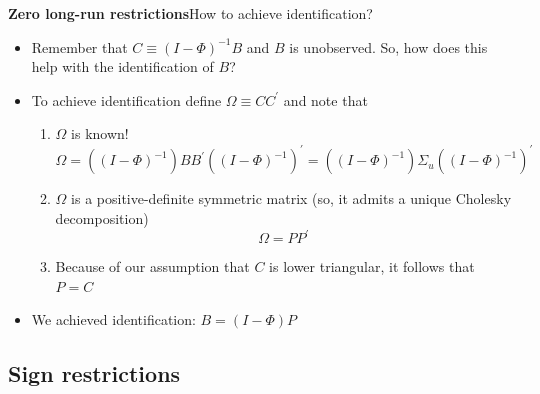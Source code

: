 \begin{frame}
{\textbf{Zero long-run restrictions}}{How to achieve identification?}%
\smallskip

\begin{itemize}
\item Remember that $C\equiv \left( I-\Phi \right) ^{-1}B$ and $B$ is
unobserved. So, how does this help with the identification of $B$?\bigskip 
\pause

\item To achieve identification define $\Omega \equiv CC^{\prime }$ and note
that\smallskip

\begin{enumerate}
\item $\Omega $ is known!%
\begin{equation*}
\Omega =\left( \left( I-\Phi \right) ^{-1}\right) BB^{\prime }\left( \left(
I-\Phi \right) ^{-1}\right) ^{\prime }=\left( \left( I-\Phi \right)
^{-1}\right) \Sigma _{u}\left( \left( I-\Phi \right) ^{-1}\right) ^{\prime }
\end{equation*}%
\pause

\item $\Omega $ is a positive-definite symmetric matrix (so, it admits a
unique Cholesky decomposition)%
\begin{equation*}
\Omega =PP^{\prime }
\end{equation*}%
\pause\vspace{-0.15cm}

\item Because of our assumption that $C$ is lower triangular, it follows
that $P=C$\bigskip \pause
\end{enumerate}

\item We achieved identification: $B=\left( I-\Phi \right) P$
\end{itemize}
\end{frame}


\subsection{Sign restrictions}

\begin{frame}
\vspace{3cm} \color{title}\bigskip

\color{note}
\end{frame}

